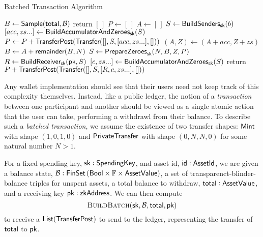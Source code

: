\begin{algorithm*}
\caption{Batched Transaction Algorithm}
\begin{algorithmic}
        \State $B \gets {\textsf{Sample}}({\textsf{total}}, \mathcal{B})$  
            \State \textsf{return} $[\,]$ 
        \EndIf
        \State $P \gets [\,]$ 
         
            \State $A \gets [\,]$
             
                \State $S \gets {\textsf{BuildSenders}}_{\textsf{sk}}(b)$
                \State $[acc, zs...] \gets {\textsf{BuildAccumulatorAndZeroes}}_{\textsf{sk}}(S)$ 
                \State $P \gets P + {\textsf{TransferPost}}({\textsf{Transfer}}([], S, [acc, zs...], []))$
                \State $(A, Z) \gets (A + acc, Z + zs)$ 
            \EndFor
            \State $B \gets A + {\textsf{remainder}}(B, N)$
        \EndWhile
        \State $S \gets {\textsf{PrepareZeroes}}_{\textsf{sk}}(N, B, Z, P)$ 
        \State $R \gets {\textsf{BuildReceiver}}_{\textsf{sk}}({\textsf{pk}}, S)$
        \State $[c, zs...] \gets {\textsf{BuildAccumulatorAndZeroes}}_{\textsf{sk}}(S)$
        \State \textsf{return} $P + {\textsf{TransferPost}}({\textsf{Transfer}}([], S, [R, c, zs...], []))$
    \EndProcedure
\end{algorithmic}
\end{algorithm*}

Any wallet implementation should see that their users need not keep track of this complexity themselves. Instead, like a public ledger, the notion of a \emph{transaction} between one participant and another should be viewed as a single atomic action that the user can take, performing a withdrawl from their balance. To describe such a \emph{batched transaction}, we assume the existence of two transfer shapes\footnotemark{}: ${\textsf{Mint}}$ with shape $(1, 0, 1, 0)$ and ${\textsf{PrivateTransfer}}$ with shape $(0, N, N, 0)$ for some natural number $N > 1$.


For a fixed spending key, ${\textsf{sk}} : {\textsf{SpendingKey}}$, and asset id, ${\textsf{id}} : {\textsf{AssetId}}$, we are given a balance state, $\mathcal{B} : {\textsf{FinSet}}\left({\textsf{Bool}} \times {\mathbb{F}} \times {\textsf{AssetValue}}\right)$, a set of transparenct-blinder-balance triples for unspent assets, a total balance to withdraw, ${\textsf{total}} : {\textsf{AssetValue}}$, and a receiving key ${\textsf{pk}} : {\textsf{zkAddress}}$. We can then compute 
\[\textsc{BuildBatch}({\textsf{sk}}, \mathcal{B}, {\textsf{total}}, {\textsf{pk}})\]
to receive a ${\textsf{List}}({\textsf{TransferPost}})$ to send to the ledger, representing the transfer of ${\textsf{total}}$ to ${\textsf{pk}}$.

